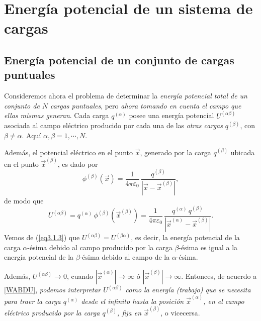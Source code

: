 \section{Energía potencial de un sistema de cargas}  \label{ed3_1}

\subsection{Energía potencial de un conjunto de cargas puntuales}
\label{ed3_1_1}

Consideremos ahora el problema de determinar la \textit{energía potencial total de un
conjunto de $N$ cargas puntuales}, pero \textit{ahora tomando en cuenta el campo que ellas mismas generan}. Cada carga $q^{(\alpha)}$ posee una energía
potencial $U^{(\alpha\beta)}$ asociada al campo eléctrico producido por cada una de las \textit{otras cargas}  $q^{(\beta)}$, con $\beta\ne \alpha$. Aquí $\alpha,\beta=1,\cdots, N$.

Además, el potencial eléctrico en el punto $\vec{x}$, generado por la carga $q^{(\beta)}$
ubicada en el punto $\vec{x}^{(\beta)}$, es dado por
\begin{equation}
\phi^{(\beta)}(\vec{x})=\frac{1}{4\pi\varepsilon_0}\,\frac{q^{(\beta)}}{|\vec{x}
-\vec{x}^{(\beta)}|} ,
\end{equation}
de modo que
\begin{equation} \label{eq3.1.3}
U^{(\alpha\beta)}=q^{(\alpha)}\,\phi^{(\beta)}(\vec{x}^{(\beta)})=\frac{1}{4\pi\varepsilon_0}\,\frac{q^{(\alpha)}\,q^{(\beta)}}{|\vec{x}^{(\alpha)}-\vec{x}^{(\beta)}|}.
\end{equation}
Vemos de (\ref{eq3.1.3}) que $U^{(\alpha\beta)}=U^{(\beta\alpha)}$, es decir, la energía potencial de la carga $\alpha$-ésima debido al campo producido por la carga
$\beta$-ésima es igual a la energía potencial de la $\beta$-ésima debido al campo
de la $\alpha$-ésima.

Además,  $U^{(\alpha\beta)}\to 0$, cuando  $|\vec{x}^{(\alpha)}|\to\infty$
ó $|\vec{x}^{(\beta)}|\to\infty$. Entonces, de acuerdo a \eqref{WABDU}, \textit{podemos interpretar $U^{(\alpha\beta)}$ como la energía (trabajo) que se necesita para traer la carga
$q^{(\alpha)}$ desde el infinito hasta la posición $\vec{x}^{(\alpha)}$, en el campo
eléctrico producido por la carga $q^{(\beta)}$, fija en $\vec{x}^{(\beta)}$}, o
vicecersa.


